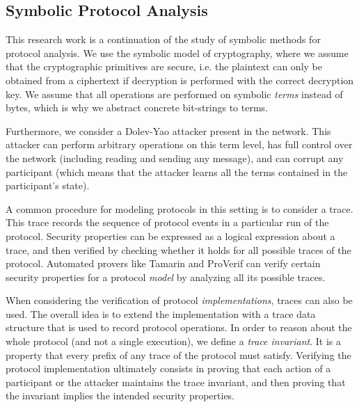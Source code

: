 \documentclass{article}
\begin{document}
\subsection{Symbolic Protocol Analysis}
\label{sec:symbolic-analysis}

This research work is a continuation of the study of symbolic methods for protocol analysis.
We use the symbolic model of cryptography, where we assume that the cryptographic primitives are secure, i.e. the plaintext can only be obtained from a ciphertext if decryption is performed with the correct decryption key.
We assume that all operations are performed on symbolic \emph{terms} instead of bytes, which is why we abstract concrete bit-strings to terms.

Furthermore, we consider a Dolev-Yao\cite{dolev1983security} attacker present in the network. This attacker can perform arbitrary operations on this term level, has full control over the network (including reading and sending any message), and can corrupt any participant (which means that the attacker learns all the terms contained in the participant's state).

A common procedure for modeling protocols in this setting is to consider a trace. This trace records the sequence of protocol events in a particular run of the protocol.
Security properties can be expressed as a logical expression about a trace, and then verified by checking whether it holds for all possible traces of the protocol.
Automated provers like Tamarin and ProVerif can verify certain security properties for a protocol \emph{model} by analyzing all its possible traces.

When considering the verification of protocol \emph{implementations}, traces can also be used. The overall idea is to extend the implementation with a trace data structure that is used to record protocol operations. In order to reason about the whole protocol (and not a single execution), we define a \emph{trace invariant}. It is a property that every prefix of any trace of the protocol must satisfy.
Verifying the protocol implementation ultimately consists in proving that each action of a participant or the attacker maintains the trace invariant, and then proving that the invariant implies the intended security properties.
\end{document}
